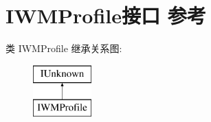 \hypertarget{interface_i_w_m_profile}{}\section{I\+W\+M\+Profile接口 参考}
\label{interface_i_w_m_profile}
类 I\+W\+M\+Profile 继承关系图\+:\begin{figure}[H]
\begin{center}
\leavevmode
\includegraphics[height=2.000000cm]{interface_i_w_m_profile}
\end{center}
\end{figure}
